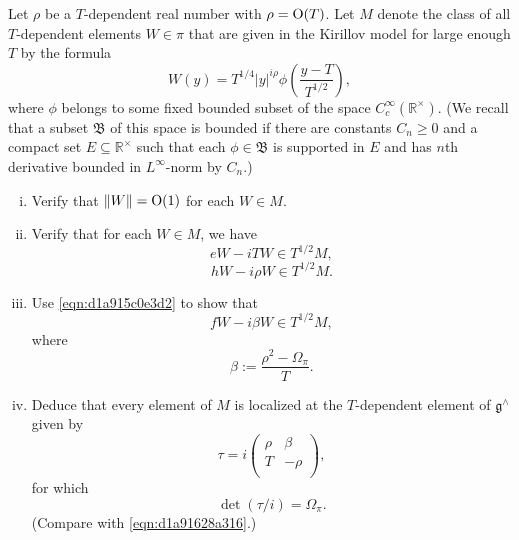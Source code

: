 \documentclass[reqno]{amsart} 
\numberwithin{equation}{section}
\begin{document}
\begin{exercise}
  Let $\rho$ be a $T$-dependent real number with $\rho = \operatorname{O}(T)$.  Let $M$ denote the class of all $T$-dependent elements $W \in \pi$ that are given in the Kirillov model for large enough $T$ by the formula
  \begin{equation*}
    W(y) =
    T^{1/4}
    \lvert y \rvert^{i \rho }
    \phi \left( \frac{y - T}{T^{1/2} } \right),
  \end{equation*}
  where $\phi$ belongs to some fixed bounded subset of the space $C_c^\infty(\mathbb{R}^\times)$.  (We recall that a subset $\mathfrak{B}$ of this space is bounded if there are constants $C_n \geq 0$ and a compact set $E \subseteq \mathbb{R}^\times$ such that each $\phi \in \mathfrak{B}$ is supported in $E$ and has $n$th derivative bounded in $L^\infty$-norm by $C_n$.)
  \begin{enumerate}[(i)]
  \item Verify that $\lVert W \rVert = \operatorname{O}(1)$ for each $W \in M$.
  \item Verify that for each $W \in M$, we have
    \begin{equation*}
      e W - i T W \in T^{1/2} M,
    \end{equation*}
    \begin{equation*}
      h W
      - i \rho W
      \in T^{1/2} M.
    \end{equation*}
  \item Use \eqref{eqn:d1a915c0e3d2} to show that
    \begin{equation*}
      f W - i \beta W \in T^{1/2} M,
    \end{equation*}
    where
    \begin{equation*}
      \beta := \frac{\rho^2 - \Omega_\pi}{T}.
    \end{equation*}    
  \item Deduce that every element of $M$ is localized at the $T$-dependent element of $\mathfrak{g}^\wedge$ given by
    \begin{equation*}
      \tau = i 
      \begin{pmatrix}
        \rho  & \beta \\
        T  & -\rho \\
      \end{pmatrix},
    \end{equation*}
    for which
    \begin{equation*}
      \det (\tau/i) = \Omega_\pi.
    \end{equation*}
    (Compare with \eqref{eqn:d1a91628a316}.)
  \end{enumerate}
\end{exercise}
\end{document}
